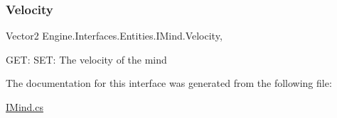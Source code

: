 \subsubsection{\texorpdfstring{Velocity}{Velocity}}
{\footnotesize\ttfamily Vector2 Engine.\+Interfaces.\+Entities.\+I\+Mind.\+Velocity\hspace{0.3cm}{\ttfamily [get]}, {\ttfamily [set]}}



G\+ET\+: S\+ET\+: The velocity of the mind 



The documentation for this interface was generated from the following file\+:\begin{DoxyCompactItemize}
\item 
\hyperlink{a00116}{I\+Mind.\+cs}\end{DoxyCompactItemize}
